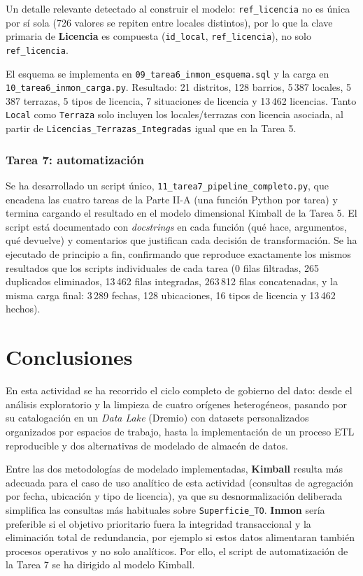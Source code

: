 \documentclass[11pt]{article}
\begin{document}
Un detalle relevante detectado al construir el modelo: \texttt{ref\_licencia} no es única
por sí sola (726 valores se repiten entre locales distintos), por lo que la clave primaria
de \textbf{Licencia} es compuesta (\texttt{id\_local}, \texttt{ref\_licencia}), no solo
\texttt{ref\_licencia}.

El esquema se implementa en \texttt{09\_tarea6\_inmon\_esquema.sql} y la carga en
\texttt{10\_tarea6\_inmon\_carga.py}. Resultado: 21 distritos, 128 barrios, 5\,387 locales,
5\,387 terrazas, 5 tipos de licencia, 7 situaciones de licencia y 13\,462 licencias. Tanto
\texttt{Local} como \texttt{Terraza} solo incluyen los locales/terrazas con licencia
asociada, al partir de \texttt{Licencias\_Terrazas\_Integradas} igual que en la Tarea 5.

\subsubsection{Tarea 7: automatización}

Se ha desarrollado un script único, \texttt{11\_tarea7\_pipeline\_completo.py}, que
encadena las cuatro tareas de la Parte II-A (una función Python por tarea) y termina
cargando el resultado en el modelo dimensional Kimball de la Tarea 5. El script está
documentado con \emph{docstrings} en cada función (qué hace, argumentos, qué devuelve) y
comentarios que justifican cada decisión de transformación. Se ha ejecutado de principio a
fin, confirmando que reproduce exactamente los mismos resultados que los scripts
individuales de cada tarea (0 filas filtradas, 265 duplicados eliminados,
13\,462 filas integradas, 263\,812 filas concatenadas, y la misma carga final: 3\,289
fechas, 128 ubicaciones, 16 tipos de licencia y 13\,462 hechos).

\section{Conclusiones}

En esta actividad se ha recorrido el ciclo completo de gobierno del dato: desde el
análisis exploratorio y la limpieza de cuatro orígenes heterogéneos, pasando por su
catalogación en un \emph{Data Lake} (Dremio) con datasets personalizados organizados por
espacios de trabajo, hasta la implementación de un proceso ETL reproducible y dos
alternativas de modelado de almacén de datos.

Entre las dos metodologías de modelado implementadas, \textbf{Kimball} resulta más
adecuada para el caso de uso analítico de esta actividad (consultas de agregación por
fecha, ubicación y tipo de licencia), ya que su desnormalización deliberada simplifica las
consultas más habituales sobre \texttt{Superficie\_TO}. \textbf{Inmon} sería preferible si
el objetivo prioritario fuera la integridad transaccional y la eliminación total de
redundancia, por ejemplo si estos datos alimentaran también procesos operativos y no solo
analíticos. Por ello, el script de automatización de la Tarea 7 se ha dirigido al modelo
Kimball.
\end{document}
